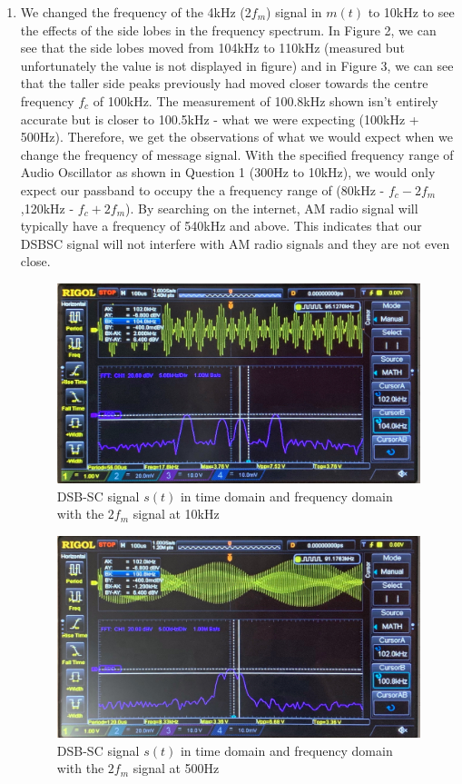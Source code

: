 \documentclass[11pt]{article}
\begin{document}
\begin{enumerate}[label=(\alph*)]
\item %
We changed the frequency of the 4kHz (2$f_m$) signal in $m(t)$ to 10kHz to see the effects of the side lobes in the frequency spectrum. In Figure 2, we can see that the side lobes moved from 104kHz to 110kHz (measured but unfortunately the value is not displayed in figure) and in Figure 3, we can see that the taller side peaks previously had moved closer towards the centre frequency $f_c$ of 100kHz. The measurement of 100.8kHz shown isn't entirely accurate but is closer to 100.5kHz - what we were expecting (100kHz + 500Hz). Therefore, we get the observations of what we would expect when we change the frequency of message signal. With the specified frequency range of Audio Oscillator as shown in Question 1 (300Hz to 10kHz), we would only expect our passband to occupy the a frequency range of (80kHz - $f_c - 2f_m$,120kHz - $f_c + 2f_m$). By searching on the internet, AM radio signal will typically have a frequency of 540kHz and above. This indicates that our DSBSC signal will not interfere with AM radio signals and they are not even close.
\begin{figure}[H]
    \centering
    \includegraphics[scale = 0.18]{Q2d10kHz.jpg}
    \caption{\label{fig:q2d10k}DSB-SC signal $s(t)$ in time domain and frequency domain with the $2f_m$ signal at 10kHz}
\end{figure}
\begin{figure}[H]
    \centering
    \includegraphics[scale = 0.21]{Q2d500Hz.jpg}
    \caption{\label{fig:q2d500}DSB-SC signal $s(t)$ in time domain and frequency domain with the $2f_m$ signal at 500Hz}
\end{figure}
\end{enumerate}
\end{document}
